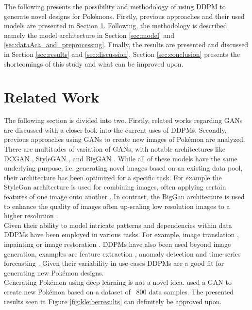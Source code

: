 \documentclass[12pt]{article}
\theoremstyle{plain}
\theoremstyle{definition}
\theoremstyle{remark}
\begin{document}
The following presents the possibility and methodology of using \ac{DDPM} to generate novel designs for Pokémons. Firstly, previous approaches and their used models are presented in Section \ref{sec:relwork}. Following, the methodology is described namely the model architecture in Section \ref{sec:model} and \ref{sec:dataAca_and_preprocessing}. Finally, the results are presented and discussed in Section \ref{sec:results} and \ref{sec:discussion}. Section \ref{sec:conclusion} presents the shortcomings of this study and what can be improved upon. 
%
%
\section{Related Work}
\label{sec:relwork}
The following section is divided into two. Firstly, related works regarding \ac{GAN}s are discussed with a closer look into the current uses of \ac{DDPM}s. Secondly, previous approaches using \ac{GAN}s to create new images of Pokémon are analyzed. 
There are multitudes of variation of \ac{GAN}s, with notable architectures like \ac{DCGAN} \citep{Radford2016}, StyleGAN \citep{Karras2019}, and BigGAN \citep{Brock2019}. While all of these models have the same underlying purpose, i.e. generating novel images based on an existing data pool, their architecture has been optimized for a specific task. For example the StyleGan architecture is used for combining images, often applying certain features of one image onto another \citep{Karras2019}. In contrast, the BigGan architecture is used to enhance the quality of images often up-scaling low resolution images to a higher resolution \citep{Brock2019}. \\
Given their ability to model intricate patterns and dependencies within data \ac{DDPM}s have been employed in various tasks. For example, image translation \citep{Sasaki2021}, inpainting \citep{Lugmayr2022} or image restoration \citep{Nair2023}. \ac{DDPM}s have also been used beyond image generation, examples are feature extraction \citep{Bandara2024}, anomaly detection \citep{Wyatt2022} and time-series forecasting \citep{Rasul2021}. Given their variability in use-cases \ac{DDPM}s are a good fit for generating new Pokémon designs. \\


Generating Pokémon using deep learning is not a novel idea. \cite{Kleiber2020} used a \ac{GAN} to create new Pokémon based on a dataset of ~800 data samples. The presented results seen in Figure \ref{fig:kleiberresults} can definitely be approved upon.\\
 
\end{document}
